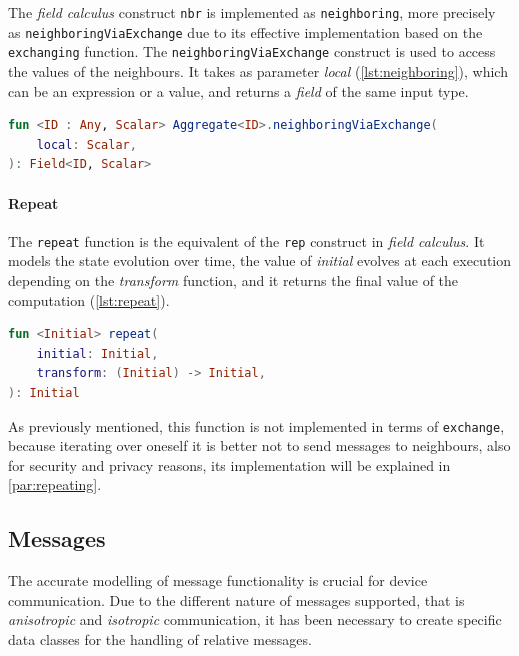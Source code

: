The \emph{field calculus} construct \texttt{nbr} is implemented as \texttt{neighboring}, more precisely as \texttt{neighboringViaExchange}
due to its effective implementation based on the \texttt{exchanging} function.
The \texttt{neighboringViaExchange} construct is used to access the values of the neighbours.
It takes as parameter \emph{local} (\ref{lst:neighboring}), which can be an expression or a value, and returns a \emph{field} of the same input type.

\begin{lstlisting}[language=kt,label={lst:neighboring}, caption={The signature of the \texttt{neighboringViaExchange} function.}]
fun <ID : Any, Scalar> Aggregate<ID>.neighboringViaExchange(
    local: Scalar,
): Field<ID, Scalar>
\end{lstlisting}

\paragraph{Repeat}
The \texttt{repeat} function is the equivalent of the \texttt{rep} construct in \emph{field calculus}.
It models the state evolution over time, the value of \emph{initial} evolves at each execution depending on the \emph{transform} function,
and it returns the final value of the computation (\ref{lst:repeat}).

\begin{lstlisting}[language=kt,label={lst:repeat}, caption={The signature of the \texttt{repeat} function.}]
fun <Initial> repeat(
    initial: Initial,
    transform: (Initial) -> Initial,
): Initial
\end{lstlisting}

As previously mentioned, this function is not implemented in terms of \texttt{exchange}, because iterating over oneself
it is better not to send messages to neighbours, also for security and privacy reasons, its implementation will be explained in \ref{par:repeating}.

\subsection{Messages}
\label{subsec:messages}

The accurate modelling of message functionality is crucial for device communication.
Due to the different nature of messages supported, that is \emph{anisotropic} and \emph{isotropic} communication,
it has been necessary to create specific data classes for the handling of relative messages.

